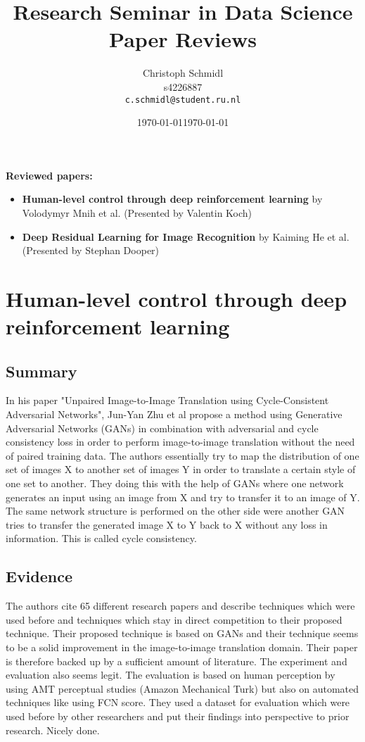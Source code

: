 \documentclass[a4paper]{article}
\title{Research Seminar in Data Science\\Paper Reviews}
\author{
  Christoph Schmidl\\ s4226887\\      \texttt{c.schmidl@student.ru.nl}
}
\date{\today}
\date{\today}
\begin{document}
\maketitle

\textbf{Reviewed papers:}

\begin{itemize}
	\item \textbf{Human-level control through deep reinforcement learning} by Volodymyr Mnih et al. (Presented by Valentin Koch)
	\item \textbf{Deep Residual Learning for Image Recognition} by Kaiming He et al. (Presented by Stephan Dooper)
\end{itemize}


\section{Human-level control through deep reinforcement learning}

\subsection{Summary}

In his paper "Unpaired Image-to-Image Translation using Cycle-Consistent Adversarial Networks", Jun-Yan Zhu et al propose a method using Generative Adversarial Networks (GANs) in combination with adversarial and cycle consistency loss in order to perform image-to-image translation without the need of paired training data. The authors essentially try to map the distribution of one set of images X to another set of images Y in order to translate a certain style of one set to another. They doing this with the help of GANs where one network generates an input using an image from X and try to transfer it to an image of Y. The same network structure is performed on the other side were another GAN tries to transfer the generated image X to Y back to X without any loss in information. This is called cycle consistency.

\subsection{Evidence}

The authors cite 65 different research papers and describe techniques which were used before and techniques which stay in direct competition to their proposed technique. Their proposed technique is based on GANs and their technique seems to be a solid improvement in the image-to-image translation domain. Their paper is therefore backed up by a sufficient amount of literature. The experiment and evaluation also seems legit. The evaluation is based on human perception by using AMT perceptual studies (Amazon Mechanical Turk) but also on automated techniques like using FCN score. They used a dataset for evaluation which were used before by other researchers and put their findings into perspective to prior research. Nicely done.
\end{document}
